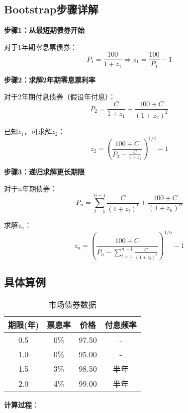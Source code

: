 \subsection{Bootstrap步骤详解}

\textbf{步骤1：从最短期债券开始}

对于1年期零息票债券：
\begin{equation}
P_1 = \frac{100}{1+z_1} \Rightarrow z_1 = \frac{100}{P_1} - 1
\end{equation}

\textbf{步骤2：求解2年期零息票利率}

对于2年期付息债券（假设年付息）：
\begin{equation}
P_2 = \frac{C}{1+z_1} + \frac{100+C}{(1+z_2)^2}
\end{equation}

已知$z_1$，可求解$z_2$：
\begin{equation}
z_2 = \left(\frac{100+C}{P_2 - \frac{C}{1+z_1}}\right)^{1/2} - 1
\end{equation}

\textbf{步骤3：递归求解更长期限}

对于$n$年期债券：
\begin{equation}
P_n = \sum_{t=1}^{n-1} \frac{C}{(1+z_t)^t} + \frac{100+C}{(1+z_n)^n}
\end{equation}

求解$z_n$：
\begin{equation}
z_n = \left(\frac{100+C}{P_n - \sum_{t=1}^{n-1} \frac{C}{(1+z_t)^t}}\right)^{1/n} - 1
\end{equation}

\subsection{具体算例}

\begin{table}[h]
\centering
\caption{市场债券数据}
\begin{tabular}{|c|c|c|c|}
\hline
\textbf{期限(年)} & \textbf{票息率} & \textbf{价格} & \textbf{付息频率} \\
\hline
0.5 & 0\% & 97.50 & - \\
1.0 & 0\% & 95.00 & - \\
1.5 & 3\% & 98.50 & 半年 \\
2.0 & 4\% & 99.00 & 半年 \\
\hline
\end{tabular}
\end{table}

\textbf{计算过程}：

